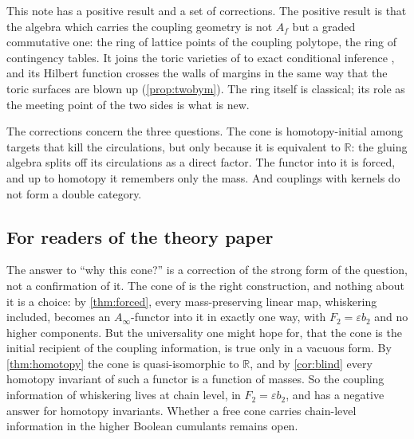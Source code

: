 \documentclass[11pt]{article}
\theoremstyle{definition}
\theoremstyle{remark}
\newcommand{\R}{\mathbb{R}}
\begin{document}
This note has a positive result and a set of corrections. The positive result is that the algebra which carries the coupling
geometry is not $A_f$ but a graded commutative one: the ring of lattice points of the coupling polytope, the ring of
contingency tables. It joins the toric varieties of \cite{Conditionals,Family} to exact conditional inference
\cite{DiaconisSturmfels1998}, and its Hilbert function crosses the walls of margins in the same way that the toric surfaces
are blown up (\cref{prop:twobym}). The ring itself is classical; its role as the meeting point of the two sides is what is new.

The corrections concern the three questions. The cone is homotopy-initial among targets that kill the circulations, but only
because it is equivalent to $\R$: the gluing algebra splits off its circulations as a direct factor. The functor into it is
forced, and up to homotopy it remembers only the mass. And couplings with kernels do not form a double category.

\subsection{For readers of the theory paper}\label{sec:forreaders}
The answer to ``why this cone?'' is a correction of the strong form of the
question, not a confirmation of it. The cone of \cite[Thm.~5.2]{Conditionals} is the right construction, and nothing about it
is a choice: by \cref{thm:forced}, every mass-preserving linear map, whiskering included, becomes an $A_\infty$-functor into it in
exactly one way, with $F_2=\varepsilon b_2$ and no higher components. But the universality one might hope for, that the cone is
the initial recipient of the coupling information, is true only in a vacuous form. By \cref{thm:homotopy} the cone is
quasi-isomorphic to $\R$, and by \cref{cor:blind} every homotopy invariant of such a functor is a function of masses. So the
coupling information of whiskering lives at chain level, in $F_2=\varepsilon b_2$, and \cite[Question~9.4(i)]{Conditionals}
has a negative answer for homotopy invariants. Whether a free cone carries chain-level information in the higher Boolean
cumulants remains open.
\end{document}
